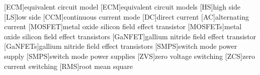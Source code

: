 
\begin{acronym}[IWESsss] %
        [ECM]{equivalent circuit model}
        [ECM]{equivalent circuit models}
        [HS]{high side}
        [LS]{low side}
        [CCM]{continuous current mode}
        [DC]{direct current}
        [AC]{alternating current}
        [MOSFET]{metal oxide silicon field effect transistor}
        [MOSFETs]{metal oxide silicon field effect transistors}
        [GaNFET]{gallium nitride field effect transistor}
        [GaNFETs]{gallium nitride field effect transistors}
        [SMPS]{switch mode power supply}
        [SMPS]{switch mode power supplies}
        [ZVS]{zero voltage switching}
        [ZCS]{zero current switching}
        [RMS]{root mean square}
\end{acronym}
\thispagestyle{empty}

